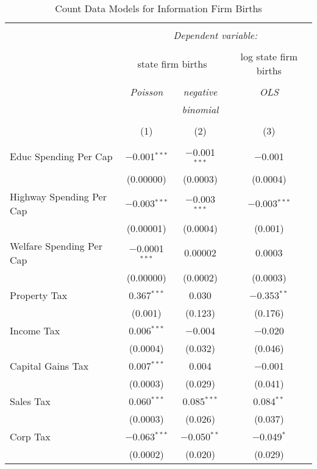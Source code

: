 
\begin{table}[!htbp] \centering 
  \caption{Count Data Models for Information Firm Births} 
  \label{} 
\begin{tabular}{@{\extracolsep{5pt}}lccc} 
\\[-1.8ex]\hline 
\hline \\[-1.8ex] 
 & \multicolumn{3}{c}{\textit{Dependent variable:}} \\ 
\cline{2-4} 
\\[-1.8ex] & \multicolumn{2}{c}{state firm births} & log state firm births \\ 
\\[-1.8ex] & \textit{Poisson} & \textit{negative} & \textit{OLS} \\ 
 & \textit{} & \textit{binomial} & \textit{} \\ 
\\[-1.8ex] & (1) & (2) & (3)\\ 
\hline \\[-1.8ex] 
 Educ Spending Per Cap & $-$0.001$^{***}$ & $-$0.001$^{***}$ & $-$0.001 \\ 
  & (0.00000) & (0.0003) & (0.0004) \\ 
  Highway Spending Per Cap  & $-$0.003$^{***}$ & $-$0.003$^{***}$ & $-$0.003$^{***}$ \\ 
  & (0.00001) & (0.0004) & (0.001) \\ 
  Welfare Spending Per Cap  & $-$0.0001$^{***}$ & 0.00002 & 0.0003 \\ 
  & (0.00000) & (0.0002) & (0.0003) \\ 
  Property Tax & 0.367$^{***}$ & 0.030 & $-$0.353$^{**}$ \\ 
  & (0.001) & (0.123) & (0.176) \\ 
  Income Tax & 0.006$^{***}$ & $-$0.004 & $-$0.020 \\ 
  & (0.0004) & (0.032) & (0.046) \\ 
  Capital Gains Tax & 0.007$^{***}$ & 0.004 & $-$0.001 \\ 
  & (0.0003) & (0.029) & (0.041) \\ 
  Sales Tax & 0.060$^{***}$ & 0.085$^{***}$ & 0.084$^{**}$ \\ 
  & (0.0003) & (0.026) & (0.037) \\ 
  Corp Tax & $-$0.063$^{***}$ & $-$0.050$^{**}$ & $-$0.049$^{*}$ \\ 
  & (0.0002) & (0.020) & (0.029) \\ 

\end{tabular}
\end{table}

